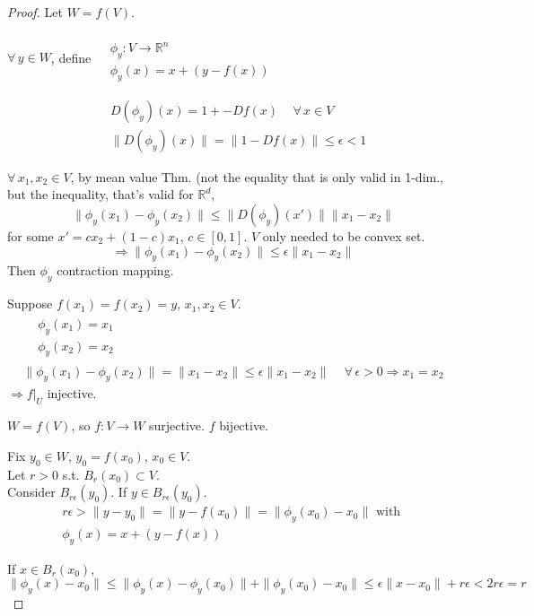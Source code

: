 \documentclass[10pt]{amsart}
\begin{document}
\begin{multicols*}{2}
\begin{proof}
Let $W=f(V)$.  

$\forall \, y \in W$, define $\begin{aligned} & \quad \\
  & \phi_y : V \to \mathbb{R}^n \\
  & \phi_y(x) = x + (y-f(x))\end{aligned}$

\[
\begin{aligned}
  & D(\phi_y)(x) = 1 + - Df(x) \quad \, \forall \, x \in V \\ 
  & \| D(\phi_y)(x) \| = \| 1 - Df(x) \| \leq \epsilon <1
\end{aligned}
\]

$\forall \, x_1 ,x_2 \in V$, by mean value Thm. (not the equality that is only valid in 1-dim., but the inequality, that's valid for $\mathbb{R}^d$, 
\[
\| \phi_y(x_1) - \phi_y(x_2) \| \leq \| D(\phi_y)(x') \| \| x_1 - x_2 \| 
\]
for some $x' = cx_2 + (1-c)x_1$, $c\in [0,1]$.  $V$ only needed to be convex set.  
\[
\Longrightarrow \| \phi_y(x_1) - \phi_y(x_2) \| \leq \epsilon \| x_1 - x_2 \|
\]
Then $\phi_y$ contraction mapping.  

Suppose $f(x_1) = f(x_2)=y$, $x_1,x_2 \in V$.  
\[
\begin{gathered}
\begin{aligned}
  & \phi_y(x_1) =x_1 \\ 
  & \phi_y(x_2) =x_2  
\end{aligned} \\
\| \phi_y(x_1) - \phi_y(x_2) \| = \| x_1 - x_2 \| \leq \epsilon \| x_1 - x_2 \| \quad \, \forall \, \epsilon > 0 \Longrightarrow x_1 = x_2 
\end{gathered}
\]
$\Longrightarrow \left. f\right|_U$ injective.

$W=f(V)$, so $f:V\to W$ surjective.  $f$ bijective.  

Fix $y_0 \in W$, $y_0 = f(x_0)$, $x_0 \in V$.  \\
Let $r>0$ s.t. $B_r(x_0) \subset V$.  \\
Consider $B_{r\epsilon}(y_0)$.  If $y\in B_{r\epsilon}(y_0)$.  
\[
\begin{gathered}
  r\epsilon > \| y-y_0 \| = \| y - f(x_0) \| = \| \phi_y(x_0) - x_0 \| \text{ with } \\
  \phi_y(x) = x + (y-f(x))
\end{gathered}
\]

If $x\in B_r(x_0)$, 
\[
\| \phi_y(x) -x_0 \| \leq \| \phi_y(x) - \phi_y(x_0) \|  + \| \phi_y(x_0) - x_0 \| \leq \epsilon \| x-x_0 \| + r\epsilon < 2 r\epsilon = r
\]


\end{proof}
\end{multicols*}
\end{document}
